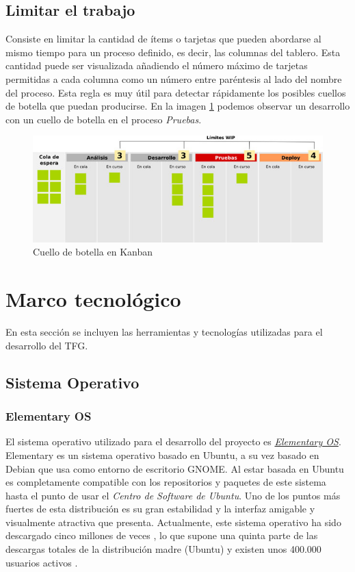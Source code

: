 	\subsection{Limitar el trabajo}
	Consiste en limitar la cantidad de ítems o tarjetas que pueden abordarse al mismo tiempo para un proceso definido, es decir, las columnas del tablero. Esta cantidad puede ser visualizada añadiendo el número máximo de tarjetas permitidas a cada columna como un número entre paréntesis al lado del nombre del proceso.
	Esta regla es muy útil para detectar rápidamente los posibles cuellos de botella que puedan producirse. En la imagen \ref{fig:kanban_table_3} podemos observar un desarrollo con un cuello de botella en el proceso \textit{Pruebas}.
	
	\begin{figure}[H]
	\centering
	\includegraphics[width=120mm, fbox={\fboxrule} 4mm]{images/04-metodo/04-kanban_table_3.jpg}
	\caption{Cuello de botella en Kanban}
	\label{fig:kanban_table_3}
	\end{figure}



\section{Marco tecnológico}
En esta sección se incluyen las herramientas y tecnologías utilizadas para el desarrollo del \ac{TFG}.

	\subsection{Sistema Operativo}
		\subsubsection{Elementary OS}
			El sistema operativo utilizado para el desarrollo del proyecto es \textit{\href{https://elementary.io/}{Elementary OS}}. Elementary	es un sistema operativo basado en Ubuntu, a su vez basado en Debian que usa como entorno de escritorio \ac{GNOME}. Al estar basada en Ubuntu es completamente compatible con los repositorios y paquetes de este sistema hasta el punto de usar el \textit{Centro de Software de Ubuntu}.
			Uno de los puntos más fuertes de esta distribución es su gran estabilidad y la interfaz amigable y visualmente atractiva que presenta. Actualmente, este sistema operativo ha sido descargado cinco millones de veces \cite{Garc15}, lo que supone una quinta parte de las descargas totales de la distribución madre (Ubuntu) y existen unos 400.000 usuarios activos \cite{Agud15}.	
	
